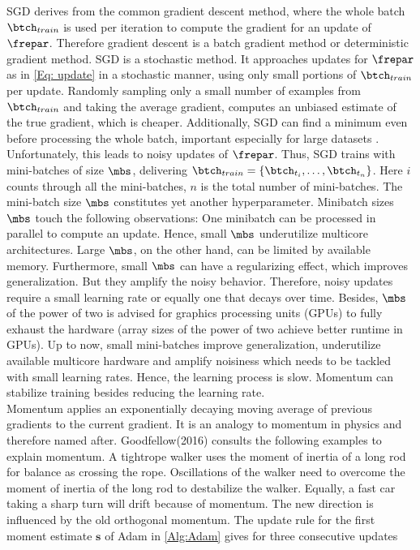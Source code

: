 SGD derives from the common gradient descent method, where the whole batch \(\btch_{train}\) is used per iteration to compute the gradient for an update of \(\frepar\). Therefore gradient descent is a batch gradient method or deterministic gradient method. SGD is a stochastic method. It approaches updates for \(\frepar\) as in \cref{Eq: update} in a stochastic manner, using only small portions of \(\btch_{train}\) per update. Randomly sampling only a small number of examples from \(\btch_{train}\) and taking the average gradient, computes an unbiased estimate of the true gradient, which is cheaper. Additionally, SGD can find a minimum even before processing the whole batch, important especially for large datasets \cite{Goodfellow}. Unfortunately, this leads to noisy updates of \(\frepar\). Thus, SGD trains with mini-batches of size \(\mbs\), delivering \(\btch_{train} = \{\btch_{t_i},\dots,\btch_{t_n}\}\). Here \(i\) counts through all the mini-batches, \(n\) is the total number of mini-batches. The mini-batch size \(\mbs\) constitutes yet another hyperparameter. Minibatch sizes \(\mbs\) touch the following observations: One minibatch can be processed in parallel to compute an update. Hence, small \(\mbs\) underutilize multicore architectures. Large \(\mbs\), on the other hand, can be limited by available memory. Furthermore, small \(\mbs\) can have a regularizing effect, which improves generalization. But they amplify the noisy behavior. Therefore, noisy updates require a small learning rate or equally one that decays over time. Besides, \(\mbs\) of the power of two is advised for graphics processing units (GPUs) to fully exhaust the hardware (array sizes of the power of two achieve better runtime in GPUs)\cite{Goodfellow}. Up to now, small mini-batches improve generalization, underutilize available multicore hardware and amplify noisiness which needs to be tackled with small learning rates. Hence, the learning process is slow.  Momentum can stabilize training besides reducing the learning rate.\\
Momentum applies an exponentially decaying moving average of previous gradients to the current gradient. It is an analogy to momentum in physics and therefore named after. Goodfellow(2016) consults the following examples to explain momentum. A tightrope walker uses the moment of inertia of a long rod for balance as crossing the rope. Oscillations of the walker need to overcome the moment of inertia of the long rod to destabilize the walker.  Equally, a fast car taking a sharp turn will drift because of momentum. The new direction is influenced by the old orthogonal momentum. The update rule for the first moment estimate \(\mathbf{s}\) of Adam in \cref{Alg:Adam} gives for three consecutive updates
